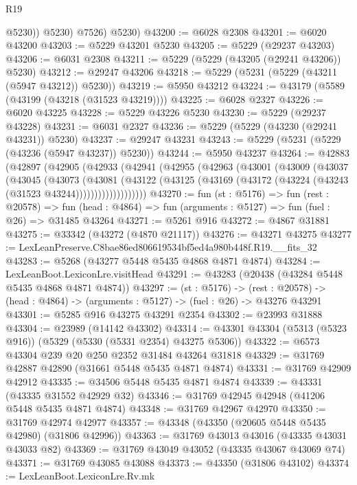 \begin{lexlean}{R19}
\begin{coremodule}
              @5230))
          @5230)
        @7526)
      @5230)
@43200 := @6028 @2308
@43201 := @6020 @43200
@43203 := @5229 @43201 @5230
@43205 := @5229 (@29237 @43203)
@43206 := @6031 @2308
@43211 := @5229 (@5229 (@43205 (@29241 @43206)) @5230)
@43212 := @29247 @43206
@43218 := @5229 (@5231 (@5229 (@43211 (@5947 @43212)) @5230))
@43219 := @5950 @43212
@43224 := @43179 (@5589 (@43199 (@43218 (@31523 @43219))))
@43225 := @6028 @2327
@43226 := @6020 @43225
@43228 := @5229 @43226 @5230
@43230 := @5229 (@29237 @43228)
@43231 := @6031 @2327
@43236 := @5229 (@5229 (@43230 (@29241 @43231)) @5230)
@43237 := @29247 @43231
@43243 := @5229 (@5231 (@5229 (@43236 (@5947 @43237)) @5230))
@43244 := @5950 @43237
@43264 := @42883
    (@42897
      (@42905
        (@42933
          (@42941
            (@42955
              (@42963
                (@43001
                  (@43009
                    (@43037
                      (@43045
                        (@43073
                          (@43081
                            (@43122
                              (@43125
                                (@43169 (@43172 (@43224 (@43243 (@31523 @43244)))))))))))))))))))
@43270 := fun (st : @5176) =>
  fun (rest : @20578) =>
  fun (head : @4864) => fun (arguments : @5127) => fun (fuel : @26) => @31485 @43264
@43271 := @5261 @916
@43272 := @4867 @31881
@43275 := @33342 (@43272 (@4870 @21117))
@43276 := @43271 @43275
@43277 := LexLeanPreserve.C8bae86ed806619534bf5ed4a980b448f.R19.__fits_32
@43283 := @5268 (@43277 @5448 @5435 @4868 @4871 @4874)
@43284 := LexLeanBoot.LexiconLre.visitHead
@43291 := @43283 (@20438 (@43284 @5448 @5435 @4868 @4871 @4874))
@43297 := (st : @5176) ->
  (rest : @20578) -> (head : @4864) -> (arguments : @5127) -> (fuel : @26) -> @43276 @43291
@43301 := @5285 @916 @43275 @43291 @2354
@43302 := @23993 @31888
@43304 := @23989 (@14142 @43302)
@43314 := @43301 @43304 (@5313 (@5323 @916)) (@5329 (@5330 (@5331 @2354) @43275 @5306))
@43322 := @6573 @43304 @239 @20 @250 @2352 @31484 @43264 @31818
@43329 := @31769 @42887 @42890 (@31661 @5448 @5435 @4871 @4874)
@43331 := @31769 @42909 @42912
@43335 := @34506 @5448 @5435 @4871 @4874
@43339 := @43331 (@43335 @31552 @42929 @32)
@43346 := @31769 @42945 @42948 (@41206 @5448 @5435 @4871 @4874)
@43348 := @31769 @42967 @42970
@43350 := @31769 @42974 @42977
@43357 := @43348 (@43350 (@20605 @5448 @5435 @42980) (@31806 @42996))
@43363 := @31769 @43013 @43016 (@43335 @43031 @43033 @82)
@43369 := @31769 @43049 @43052 (@43335 @43067 @43069 @74)
@43371 := @31769 @43085 @43088
@43373 := @43350 (@31806 @43102)
@43374 := LexLeanBoot.LexiconLre.Rv.mk

\end{coremodule}
\end{lexlean}
